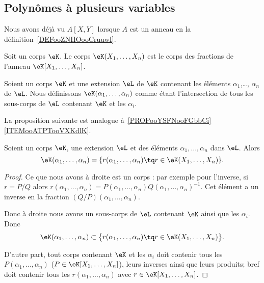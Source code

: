 \subsection{Polynômes à plusieurs variables}

Nous avons déjà vu \( A[X,Y]\) lorsque \( A\) est un anneau en la définition~\ref{DEFooZNHOooCruuwI}.

\begin{definition}      \label{DEFooRHRKooPqLNOp}
	Soit un corps \( \eK\). Le corps \( \eK(X_1,\ldots, X_n)\) est le corps des fractions de l'anneau \( \eK[X_1,\ldots, X_n]\).
\end{definition}

\begin{definition}  \label{DEFooOCPHooXneutp}
	Soient un corps \( \eK\) et une extension \( \eL\) de \( \eK\) contenant les éléments \( \alpha_1\),\ldots, \( \alpha_n\) de \( \eL\). Nous définissons \( \eK(\alpha_1,\ldots, \alpha_n)\) comme étant l'intersection de tous les sous-corps de \( \eL\) contenant \( \eK\) et les \( \alpha_i\).
\end{definition}

La proposition suivante est analogue à~\ref{PROPooYSFNooFGbbCi}\ref{ITEMooATPTooVXKdlK}.

\begin{lemma}        \label{LEMooQEJHooAmSNxU}
	Soient un corps \( \eK\), une extension \( \eL\) et des éléments \( \alpha_1,\ldots, \alpha_n\) dans \( \eL\). Alors
	\begin{equation}
		\eK(\alpha_1,\ldots, \alpha_n)=\{ r(\alpha_1,\ldots, \alpha_n)\tq r\in \eK(X_1,\ldots, X_n) \}.
	\end{equation}
\end{lemma}

\begin{proof}
	Ce que nous avons à droite est un corps : par exemple pour l'inverse, si \( r=P/Q\) alors \( r(\alpha_1,\ldots,\alpha_n)=P(\alpha_1,\ldots, \alpha_n)Q(\alpha_1,\ldots, \alpha_n)^{-1}\). Cet élément a un inverse en la fraction \( (Q/P)(\alpha_1,\ldots, \alpha_n)\).

	Donc à droite nous avons un sous-corps de \( \eL\) contenant \( \eK\) ainsi que les \( \alpha_i\). Donc
	\begin{equation}
		\eK(\alpha_1,\ldots, \alpha_n)\subset \big\{ r(\alpha_1,\ldots, \alpha_n)\tq r\in \eK(X_1,\ldots, X_n) \big\}.
	\end{equation}

	D'autre part, tout corps contenant \( \eK\) et les \( \alpha_i\) doit contenir tous les \( P(\alpha_1,\ldots, \alpha_n)\) (\( P\in \eK[X_1,\ldots, X_n]\)), leurs inverses ainsi que leurs produits; bref doit contenir tous les \( r(\alpha_1,\ldots, \alpha_n)\) avec \( r\in\eK[X_1,\ldots, X_n]\).
\end{proof}
